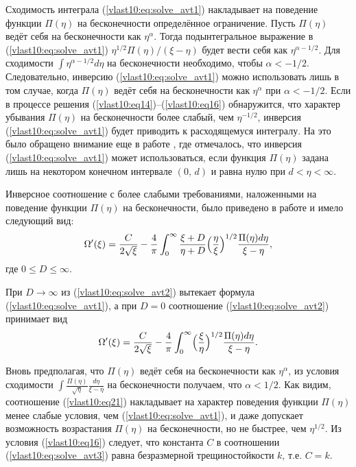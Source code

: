 Сходимость интеграла (\ref{vlast10:eq:solve_avt1}) накладывает на поведение функции $\Pi (\eta)$ на бесконечности
определённое ограничение. Пусть $\Pi (\eta)$ ведёт себя на бесконечности как $\eta^{\alpha}$.
Тогда подынтегральное выражение в (\ref{vlast10:eq:solve_avt1}) $\eta^{1/2}\Pi(\eta)/(\xi-\eta)$ будет
вести себя как $\eta^{\alpha-1/2}$. Для сходимости $\displaystyle \int{\eta^{\alpha-1/2}d\eta}$ на бесконечности необходимо,
чтобы $\alpha<-1/2$. Следовательно, инверсию (\ref{vlast10:eq:solve_avt1}) можно использовать лишь в том случае,
когда $\Pi (\eta)$ ведёт себя на бесконечности как $\eta^{\alpha}$ при $\alpha<-1/2$.
Если в процессе решения (\ref{vlast10:eq14})--(\ref{vlast10:eq16}) обнаружится, что характер убывания $\Pi(\eta)$ на
бесконечности более слабый, чем $\eta^{-1/2}$, инверсия (\ref{vlast10:eq:solve_avt1}) будет приводить к расходящемуся интегралу.
На это было обращено внимание еще в работе \cite{vlast10:4}, где отмечалось, что инверсия (\ref{vlast10:eq:solve_avt1})
может использоваться, если функция $\Pi(\eta)$
задана лишь на некотором конечном интервале $(0,\,d)$ и равна нулю при $d<\eta<\infty$.

Инверсное соотношение с более слабыми требованиями, наложенными на поведение функции $\Pi(\eta)$ на бесконечности,
было приведено в работе \cite{vlast10:5} и имело следующий вид:
\begin{equation}
\Omega^{\prime}(\xi)=\frac{C}{2\sqrt{\xi}}-\frac{4}{\pi}\int_{0}^{\infty}\frac{\xi+D}{\eta+D}\Bigl(\frac{\eta}{\xi}\Bigr)^{1/2}
\frac{\Pi(\eta)d\eta}{\xi-\eta},
\label{vlast10:eq:solve_avt2}
\end{equation}
где $0\leq D\leq\infty$.

При $D\to\infty$  из (\ref{vlast10:eq:solve_avt2}) вытекает формула (\ref{vlast10:eq:solve_avt1}), а при $D=0$
соотношение (\ref{vlast10:eq:solve_avt2}) принимает вид
\begin{equation}
\Omega^{\prime} (\xi)=\frac{C}{2\sqrt{\xi}}-\frac{4}{\pi}\int_{0}^{\infty}\Bigl(\frac{\xi}{\eta}\Bigr)^{1/2}
\frac{\Pi (\eta)d\eta}{\xi-\eta}.\label{vlast10:eq:solve_avt3}
\end{equation}

Вновь предполагая, что $\Pi (\eta)$ ведёт себя на бесконечности как $\eta^{\alpha}$,
из условия сходимости $\displaystyle\int{\frac{\Pi (\eta)}{\sqrt{\eta}}\frac{d\eta}{\xi-\eta}}$ на бесконечности получаем,
что $\alpha<1/2$. Как видим, соотношение (\ref{vlast10:eq21}) накладывает на характер поведения функции $\Pi (\eta)$
менее слабые условия, чем (\ref{vlast10:eq:solve_avt1}), и даже допускает возможность возрастания $\Pi (\eta)$
на бесконечности, но не быстрее, чем $\eta^{1/2}$. Из условия (\ref{vlast10:eq16}) следует, что константа $C$ в соотношении (\ref{vlast10:eq:solve_avt3})
равна безразмерной трещиностойкости $k$, т.е. $C = k$.

